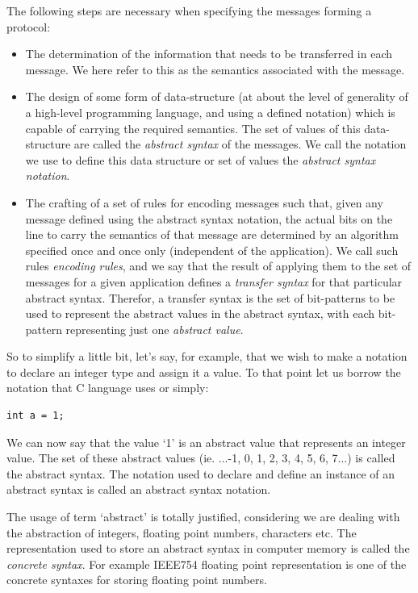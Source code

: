 \documentclass[times, utf8, diplomski]{fer}
\begin{document}
The following steps are necessary when specifying the messages forming a protocol:
\begin{itemize}
	\item The determination of the information that needs to be transferred in 
		each message. We here refer to this as the semantics associated with the message. 
	\item The design of some form of data-structure (at about the level of generality 
		of a high-level programming language, and using a defined notation) which 
		is capable of carrying the required semantics. The set of values of this 
		data-structure are called the \emph{abstract syntax} of the messages. We call 
		the notation we use to define this data structure or set of values the 
		\emph{abstract syntax notation}.
	\item The crafting of a set of rules for encoding messages such that, given 
		any message defined using the abstract syntax notation, the actual bits 
		on the line to carry the semantics of that message are determined by an 
		algorithm specified once and once only (independent of the application).
		 We call such rules \emph{encoding rules}, and we say that the result of 
		 applying them to the set of messages for a given application defines a 
		 \emph{transfer syntax} for that particular abstract syntax. Therefor, 
		 a transfer syntax is the set of bit-patterns to be used to represent 
		 the abstract values in the abstract syntax, with each bit-pattern 
		 representing just one \emph{abstract value}.
\end{itemize}

So to simplify a little bit, let's say, for example, that we wish to make a 
notation to declare an integer type and assign it a value. To that point let us 
borrow the notation that C language uses or simply:
\lstset{language=C}
\lstset{basicstyle=\tiny}
\lstset{numbers=left, numberstyle=\tiny, stepnumber=1, numbersep=5pt}
\begin{lstlisting}[frame=tb]
int a = 1;
\end{lstlisting}

We can now say that the value `1' is an abstract value that represents an integer 
value. The set of these abstract values (ie. {...-1, 0, 1, 2, 3, 4, 5, 6, 7...}) 
is called the abstract syntax. The notation used to declare and define an instance 
of an abstract syntax is called an abstract syntax notation.

The usage of term `abstract' is totally justified, considering we are dealing 
with the abstraction of integers, floating point numbers, characters etc.
The representation used to store an abstract syntax in computer memory is called
the \emph{concrete syntax}. For example IEEE754 floating point representation is
one of the concrete syntaxes for storing floating point numbers. 
\end{document}
